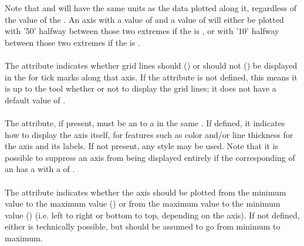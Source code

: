 \begin{blockChanged}
Note that  and  will have the same units as the data plotted along it, regardless of the value of the .  An axis with a  value of  and a  value of  will either be plotted with '50' halfway between those two extremes if the  is , or with '10' halfway between those two extremes if the  is .

\paragraph*{}
The  attribute indicates whether grid lines should () or should not () be displayed in the \Plot for tick marks along that axis.  If the  attribute is not defined, this means it is up to the tool whether or not to display the grid lines; it does not have a default value of .

\paragraph*{}
The  attribute, if present, must be an \SIdRef to a \Style in the same \SedDocument.  If defined, it indicates how to display the axis itself, for features such as color and/or line thickness for the axis and its labels.  If not present, any style may be used.  Note that it is possible to suppress an axis from being displayed entirely if the corresponding \Style of an \Axis has a  with a  of .

\paragraph*{}
The  attribute indicates whether the axis should be plotted from the minimum value to the maximum value () or from the maximum value to the minimum value () (i.e. left to right or bottom to top, depending on the axis).  If not defined, either is technically possible, but should be assumed to go from minimum to maximum.




\end{blockChanged}

